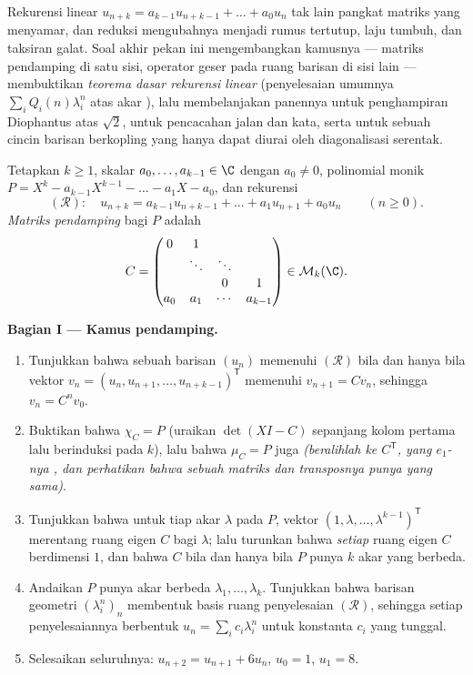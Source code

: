 Rekurensi linear $u_{n+k} = a_{k-1}u_{n+k-1} + \dots + a_0 u_n$
tak lain pangkat matriks yang menyamar, dan reduksi mengubahnya menjadi
rumus tertutup, laju tumbuh, dan taksiran galat. Soal akhir pekan
ini mengembangkan kamusnya --- matriks pendamping di satu sisi,
operator geser pada ruang barisan di sisi lain
--- membuktikan \emph{teorema dasar rekurensi linear}
(penyelesaian umumnya $\sum_i Q_i(n)\lambda_i^n$ atas akar
), lalu membelanjakan panennya untuk
penghampiran Diophantus atas $\sqrt2$, untuk pencacahan jalan
dan kata, serta untuk sebuah cincin barisan berkopling yang hanya dapat
diurai oleh diagonalisasi serentak.

\begin{problem}
\label{pb:b2:reduction:1}
Tetapkan $k \geq 1$, skalar $a_0, \dots, a_{k-1} \in \C$ dengan $a_0
\neq 0$, polinomial monik $P = X^k - a_{k-1}X^{k-1} - \dots -
a_1 X - a_0$, dan rekurensi
\[
(\mathcal R)\colon\quad u_{n+k} = a_{k-1}u_{n+k-1} + \dots +
a_1 u_{n+1} + a_0 u_n \qquad (n \geq 0).
\]
\emph{Matriks pendamping} bagi $P$ adalah
\[
C =
\begin{pmatrix}
0 & 1 & & \\
 & \ddots & \ddots & \\
 & & 0 & 1\\
a_0 & a_1 & \cdots & a_{k-1}
\end{pmatrix}
\in \mathcal{M}_k(\C).
\]

\medskip
\noindent\textbf{Bagian I --- Kamus pendamping.}
\begin{enumerate}
  \item Tunjukkan bahwa sebuah barisan $(u_n)$ memenuhi $(\mathcal R)$
        bila dan hanya bila vektor $v_n = (u_n, u_{n+1}, \dots,
        u_{n+k-1})^{\mathsf T}$ memenuhi $v_{n+1} = Cv_n$, sehingga
        $v_n = C^n v_0$.
  \item Buktikan bahwa $\chi_C = P$ (uraikan $\det(XI - C)$ sepanjang
        kolom pertama lalu berinduksi pada $k$), lalu bahwa $\mu_C = P$
        juga \emph{(beralihlah ke $C^{\mathsf T}$, yang $e_1$-nya
        , dan perhatikan bahwa sebuah matriks dan transposnya
        punya  yang sama)}.
  \item Tunjukkan bahwa untuk tiap akar $\lambda$ pada $P$, vektor
        $(1, \lambda, \dots, \lambda^{k-1})^{\mathsf T}$ merentang
        ruang eigen $C$ bagi $\lambda$; lalu turunkan bahwa
        \emph{setiap} ruang eigen $C$ berdimensi $1$, dan
        bahwa $C$  bila dan hanya bila $P$ punya $k$
        akar yang berbeda.
  \item Andaikan $P$ punya akar berbeda $\lambda_1, \dots,
        \lambda_k$. Tunjukkan bahwa barisan geometri
        $(\lambda_i^n)_n$ membentuk basis ruang penyelesaian
        $(\mathcal R)$, sehingga setiap penyelesaiannya berbentuk $u_n = \sum_i
        c_i\lambda_i^n$ untuk konstanta $c_i$ yang tunggal.
  \item Selesaikan seluruhnya: $u_{n+2} = u_{n+1} + 6u_n$, $u_0 = 1$,
        $u_1 = 8$.
\end{enumerate}


\end{problem}
